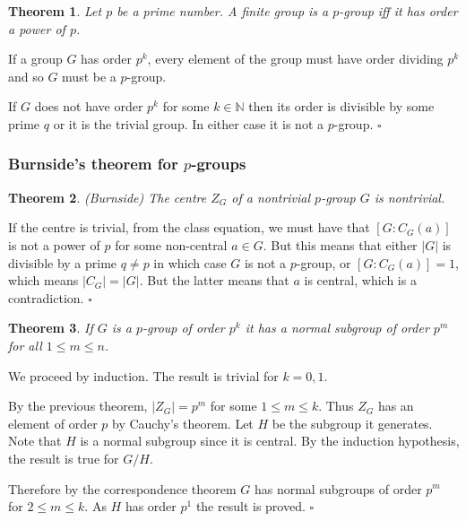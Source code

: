 \documentclass[10pt]{article}
\newcommand{\N}{\mathbb{N}}
\newtheorem{theorem}{Theorem}[section]
\newenvironment{proof}[1][Proof]{\begin{trivlist}
\item[\hskip \labelsep {\itshape #1}]}{\end{trivlist}}
\begin{document}
\begin{theorem}
Let $p$ be a prime number. A finite group is a $p$-group iff it has order a power of $p$.
\end{theorem}

\begin{proof}
If a group $G$ has order $p^k$, every element of the group must have order dividing $p^k$ and so 
$G$ must be a $p$-group.

If $G$ does not have order $p^k$ for some $k \in \N$ then its order is divisible by some prime $q$ or it is the trivial group. In either case it is not a $p$-group. $\square$
\end{proof}

\subsubsection{Burnside's theorem for $p$-groups}

\begin{theorem} (Burnside)
The centre $Z_G$ of a nontrivial $p$-group $G$ is nontrivial.
\end{theorem}

\begin{proof}
If the centre is trivial, from the class equation, we must have that $[G:C_G(a)]$ is not a power of $p$ for some non-central $a \in G$. But this means that either $|G|$ is divisible by a prime $q \neq p$ in which case $G$ is not a $p$-group, or $[G:C_G(a)] = 1$, which means $|C_G| = |G|$. But the latter means that $a$ is central, which is a contradiction. $\square$
\end{proof}

\begin{theorem} \label{pgroupsubs}
If $G$ is a $p$-group of order $p^k$ it has a normal subgroup of order $p^m$ for all $1 \leq m \leq n$.
\end{theorem}

\begin{proof}
We proceed by induction. The result is trivial for $k = 0, 1$.

By the previous theorem, $|Z_G| = p^m$ for some $1 \leq m \leq k$. Thus $Z_G$ has an element of order $p$ by Cauchy's theorem. Let $H$ be the subgroup it generates. Note that $H$ is a normal subgroup since it is central. By the induction hypothesis, the result is true for $G/H$.

Therefore by the correspondence theorem $G$ has normal subgroups of order $p^m$ for $2 \leq m \leq k$. As $H$ has order $p^1$ the result is proved. $\square$
\end{proof}
\end{document}
